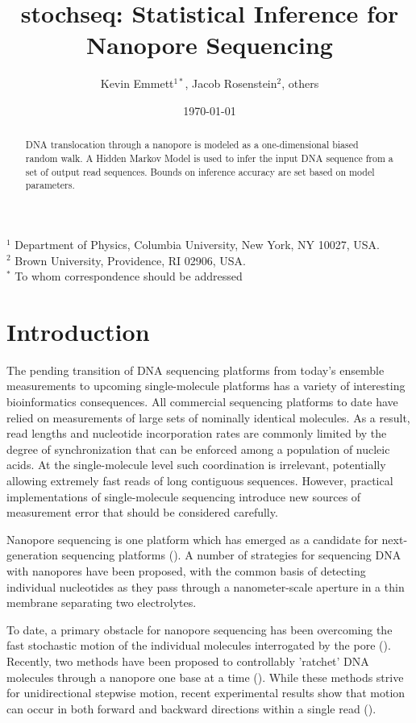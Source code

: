 \documentclass[12pt]{article}
\begin{document}
\title{stochseq: Statistical Inference for Nanopore Sequencing}
\author{Kevin Emmett$^{1*}$, Jacob Rosenstein$^{2}$, others}
\date{\today}

\maketitle

$^1$ Department of Physics, Columbia University, New York, NY 10027, USA.\\
$^2$ Brown University, Providence, RI 02906, USA.\\

$^*$ To whom correspondence should be addressed\\

\begin{abstract}
DNA translocation through a nanopore is modeled as a one-dimensional biased random walk.
A Hidden Markov Model is used to infer the input DNA sequence from a set of output read sequences.
Bounds on inference accuracy are set based on model parameters.
\end{abstract}

\section{Introduction}
The pending transition of DNA sequencing platforms from today's ensemble measurements to upcoming single-molecule platforms has a variety of interesting bioinformatics consequences.
All commercial sequencing platforms to date have relied on measurements of large sets of nominally identical molecules.
As a result, read lengths and nucleotide incorporation rates are commonly limited by the degree of synchronization that can be enforced among a population of nucleic acids.
At the single-molecule level such coordination is irrelevant, potentially allowing extremely fast reads of long contiguous sequences.
However, practical implementations of single-molecule sequencing introduce new sources of measurement error that should be considered carefully.

Nanopore sequencing is one platform which has emerged as a candidate for next-generation sequencing platforms (\cite{Branton2008}).
A number of strategies for sequencing DNA with nanopores have been proposed, with the common basis of detecting individual nucleotides as they pass through a nanometer-scale aperture in a thin membrane separating two electrolytes. 

To date, a primary obstacle for nanopore sequencing has been overcoming the fast stochastic motion of the individual molecules interrogated by the pore (\cite{Venkatesan2011,Lu2011}).
Recently, two methods have been proposed to controllably 'ratchet' DNA molecules through a nanopore one base at a time (\cite{Luan2011,Olasagasti2010}).
While these methods strive for unidirectional stepwise motion, recent experimental results show that motion can occur in both forward and backward directions within a single read (\cite{Cherf2012}).
\end{document}
